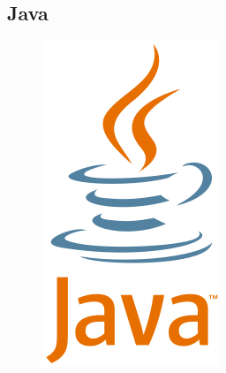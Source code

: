 \newpage

\subsection{Java}

\begin{figure}[!ht]
	\center
	\includegraphics[scale=0.3]{img/java}
\end{figure}

